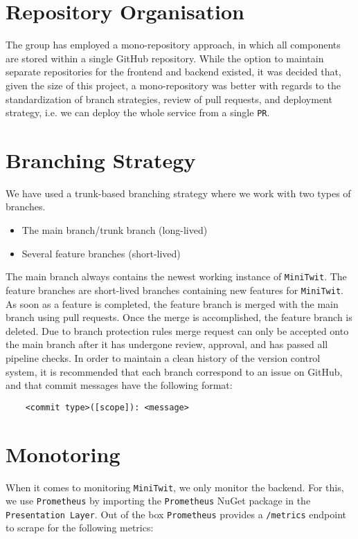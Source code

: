 \section{Repository Organisation}

The group has employed a mono-repository approach, in which all components are stored within a single GitHub repository. While the option to maintain separate repositories for the frontend and backend existed, it was decided that, given the size of this project, a mono-repository was better with regards to the standardization of branch strategies, review of pull requests, and deployment strategy, i.e. we can deploy the whole service from a single \texttt{PR}.

\section{Branching Strategy}

We have used a trunk-based branching strategy where we work with two types of branches.

\begin{itemize}
    \item The main branch/trunk branch (long-lived)
    \item Several feature branches (short-lived)
\end{itemize}

The main branch always contains the newest working instance of \texttt{MiniTwit}. The feature branches are short-lived branches containing new features for \texttt{MiniTwit}. As soon as a feature is completed, the feature branch is merged with the main branch using pull requests. Once the merge is accomplished, the feature branch is deleted. Due to branch protection rules merge request can only be accepted onto the main branch after it has undergone review, approval, and has passed all pipeline checks. In order to maintain a clean history of the version control system, it is recommended that each branch correspond to an issue on GitHub, and that commit messages have the following format:

\begin{verbatim}
    <commit type>([scope]): <message>
\end{verbatim}

\section{Monotoring}

When it comes to monitoring \texttt{MiniTwit}, we only monitor the backend. For this, we use \texttt{Prometheus} by importing the \texttt{Prometheus} NuGet package in the \texttt{Presentation Layer}. Out of the box \texttt{Prometheus} provides a \texttt{/metrics} endpoint to scrape for the following metrics:

